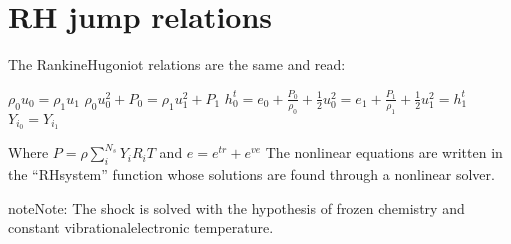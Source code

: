 \documentclass[letterpaper,10pt,english]{jupyterBook}
\begin{document}
\section{RH jump relations}
\label{\detokenize{2_Temperature/_2T_Problem_class_definition:rh-jump-relations}}
\sphinxAtStartPar
The Rankine\sphinxhyphen{}Hugoniot relations are the same and read: 

\sphinxAtStartPar
\( \rho_0 u_0 = \rho_1 u_1 \) 
\( \rho_0 u_0^2 + P_0 = \rho_1 u_1^2 + P_1 \) 
\( h_0^t  = e_0 + \frac{P_0}{\rho_0} + \frac{1}{2}u_0^2 = 
e_1 + \frac{P_1}{\rho_1} + \frac{1}{2} u_1^2 = h_1^t \) 
\( Y_{i_0} = Y_{i_1} \) 

\sphinxAtStartPar
Where \(P = \rho \sum_{i}^{N_s} Y_i R_i T \) and \(e = e^{tr} + e^{ve}\) 
The non\sphinxhyphen{}linear equations are written in the “RHsystem” function whose solutions are found through a non\sphinxhyphen{}linear solver.

\begin{sphinxadmonition}{note}{Note:}
\sphinxAtStartPar
The shock is solved with the hypothesis of frozen chemistry and constant vibrational\sphinxhyphen{}electronic temperature.
\end{sphinxadmonition}
\end{document}
